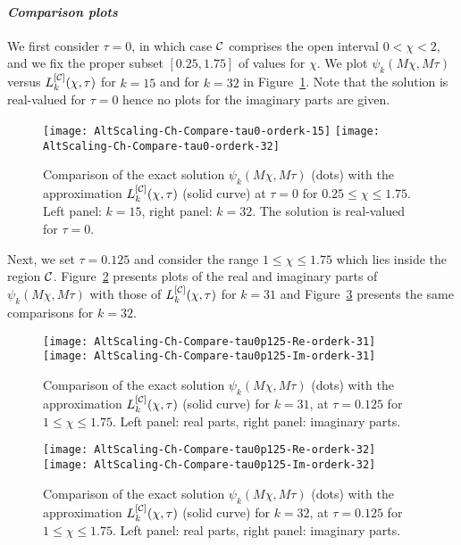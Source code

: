 \paragraph{\textit{Comparison plots}} We first consider $\tau = 0$, in which case $\mathcal{C}$ comprises the open interval $0<\chi<2$, and we fix the proper subset $[0.25,1.75]$ of values for $\chi$. We plot $\psi_{k}(M \chi, M\tau)$ versus $L_k^{[\mathcal{C}]}(\chi,\tau)$ for $k=15$ and for $k=32$ in Figure~\ref{f:comparison-channels-tau-0-k-15-32}. Note that the solution is real-valued for $\tau=0$ hence no plots for the imaginary parts are given.
\begin{figure}[h]
\texttt{[image: AltScaling-Ch-Compare-tau0-orderk-15]}\qquad
\texttt{[image: AltScaling-Ch-Compare-tau0-orderk-32]}
\caption{Comparison of the exact solution $\psi_k(M \chi, M\tau)$ (dots) with the approximation $L_k^{[\mathcal{C}]}(\chi,\tau)$ (solid curve) at $\tau=0$ for $0.25\leq \chi \leq 1.75$. Left panel: $k=15$, right panel: $k=32$. The solution is real-valued for $\tau=0$.}
\label{f:comparison-channels-tau-0-k-15-32}
\end{figure}
Next, we set $\tau=0.125$ and consider the range $1 \leq \chi \leq 1.75$ which lies inside the region $\mathcal{C}$. Figure~\ref{f:comparison-channels-tau-0p125-k-31} presents plots of the real and imaginary parts of $\psi_{k}(M \chi, M\tau)$ with those of $L_k^{[\mathcal{C}]}(\chi,\tau)$ for $k=31$ and Figure~\ref{f:comparison-channels-tau-0p125-k-32} presents the same comparisons for $k=32$.
 \begin{figure}[h]
\texttt{[image: AltScaling-Ch-Compare-tau0p125-Re-orderk-31]}\qquad
\texttt{[image: AltScaling-Ch-Compare-tau0p125-Im-orderk-31]}
\caption{Comparison of the exact solution $\psi_k(M \chi, M\tau)$ (dots) with the approximation $L_k^{[\mathcal{C}]}(\chi,\tau)$ (solid curve) for $k=31$, at $\tau=0.125$ for $1\leq \chi \leq 1.75$. Left panel: real parts, right panel: imaginary parts.}
\label{f:comparison-channels-tau-0p125-k-31}
\end{figure}
 \begin{figure}[h]
\texttt{[image: AltScaling-Ch-Compare-tau0p125-Re-orderk-32]}\qquad
\texttt{[image: AltScaling-Ch-Compare-tau0p125-Im-orderk-32]}
\caption{Comparison of the exact solution $\psi_k(M \chi, M\tau)$ (dots) with the approximation $L_k^{[\mathcal{C}]}(\chi,\tau)$ (solid curve) for $k=32$, at $\tau=0.125$ for $1 \leq \chi \leq 1.75$. Left panel: real parts, right panel: imaginary parts.}
\label{f:comparison-channels-tau-0p125-k-32}
\end{figure}

